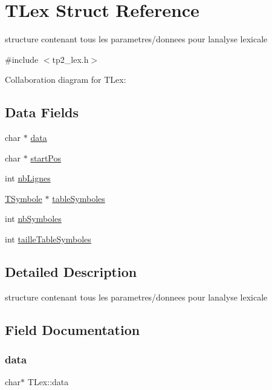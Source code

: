 \hypertarget{structTLex}{}\section{T\+Lex Struct Reference}
\label{structTLex}


structure contenant tous les parametres/donnees pour l\textquotesingle{}analyse lexicale  




{\ttfamily \#include $<$tp2\+\_\+lex.\+h$>$}



Collaboration diagram for T\+Lex\+:
\subsection*{Data Fields}
\begin{DoxyCompactItemize}
\item 
char $\ast$ \hyperlink{structTLex_a2242e630c3f871659c3e36b101b504b4}{data}
\item 
char $\ast$ \hyperlink{structTLex_a1122e1ced17c2c07f7975b4f11110ad8}{start\+Pos}
\item 
int \hyperlink{structTLex_a74499b75b25dc1bce1fb2f66af6ce1e2}{nb\+Lignes}
\item 
\hyperlink{structTSymbole}{T\+Symbole} $\ast$ \hyperlink{structTLex_a31a6c4fc0839643e3251a372ba7adf04}{table\+Symboles}
\item 
int \hyperlink{structTLex_a84d0d3a30f4b42f8db675f8cbb60373f}{nb\+Symboles}
\item 
int \hyperlink{structTLex_abb50eca8f47fc2c73983a5909967e362}{taille\+Table\+Symboles}
\end{DoxyCompactItemize}


\subsection{Detailed Description}
structure contenant tous les parametres/donnees pour l\textquotesingle{}analyse lexicale 

\subsection{Field Documentation}
\mbox{\label{structTLex_a2242e630c3f871659c3e36b101b504b4}} 
\subsubsection{\texorpdfstring{data}{data}}
{\footnotesize\ttfamily char$\ast$ T\+Lex\+::data}

